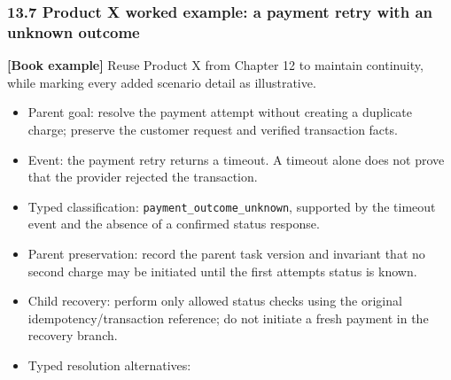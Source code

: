 \subsubsection{13.7 Product X worked example: a payment retry with an unknown outcome}\label{137-product-x-worked-example-a-payment-retry-with-an-unknown-outcome}

\textbf{{[}Book example{]}} Reuse Product X from Chapter 12 to maintain continuity, while marking every added scenario detail as illustrative.

\begin{itemize}
\tightlist
\item
  Parent goal: resolve the payment attempt without creating a duplicate charge; preserve the customer request and verified transaction facts.
\item
  Event: the payment retry returns a timeout. A timeout alone does not prove that the provider rejected the transaction.
\item
  Typed classification: \texttt{payment\_outcome\_unknown}, supported by the timeout event and the absence of a confirmed status response.
\item
  Parent preservation: record the parent task version and invariant that no second charge may be initiated until the first attempt\textquotesingle s status is known.
\item
  Child recovery: perform only allowed status checks using the original idempotency/transaction reference; do not initiate a fresh payment in the recovery branch.
\item
  Typed resolution alternatives:


\end{itemize}
